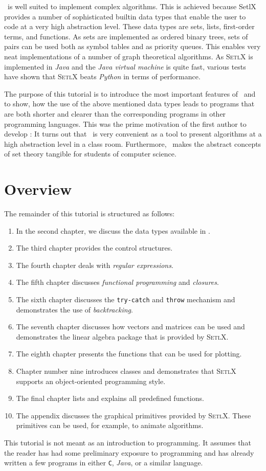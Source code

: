 \setlx\ is well suited to implement complex algorithms. This is achieved because SetlX
provides a number of sophisticated builtin data types that enable the user to code at a very high
abstraction level.
These data types are sets, lists, first-order terms, and functions.  
As sets are implemented as ordered binary trees, sets of pairs can be used both as symbol
tables and as priority queues.  This enables very neat implementations 
of a number of graph theoretical algorithms.  As \textsc{SetlX} is implemented in \textsl{Java} and
the \emph{Java virtual machine} is quite fast, various tests have shown that \textsc{SetlX} beats
\textsl{Python} in terms of performance. 


The purpose of this tutorial is to introduce the most important features of \setlx\ and to
show, how the use of the above mentioned data types leads to programs that are both shorter
and clearer than the corresponding programs in other programming languages.  This was the
prime motivation of the first author to develop \setlx:  It turns out that \setlx\ is very
convenient as a tool to present algorithms at a high abstraction level in a class room. 
Furthermore, \setlx\ makes the abstract concepts of set theory tangible for students of
computer science.  

\section{Overview}
The remainder
of this tutorial is structured as follows:
\begin{enumerate}
\item In the second chapter, we discuss the data types available in \setlx.
\item The third chapter provides the control structures.
\item The fourth chapter deals with \emph{regular expressions}.
\item The fifth chapter discusses \emph{functional programming} and \emph{closures}.
\item The sixth chapter discusses the \texttt{try-}\texttt{catch} and \texttt{throw}
      mechanism and demonstrates the use of \emph{backtracking}.
\item The seventh chapter discusses how vectors and matrices can be used and demonstrates the linear
      algebra package that is provided by \textsc{SetlX}.
\item The eighth chapter presents the functions that can be used for plotting.
\item Chapter number nine introduces classes and demonstrates that \textsc{SetlX}
      supports an object-oriented programming style.
\item The final chapter lists and explains all predefined functions.
\item The appendix discusses the graphical primitives provided by \textsc{SetlX}.
      These primitives can be used, for example, to animate algorithms.
\end{enumerate}
This tutorial is not meant as an introduction to programming.  It assumes that the reader
has had some preliminary exposure to programming and has already written a few programs in
either \texttt{C}, \textsl{Java}, or a similar language.

